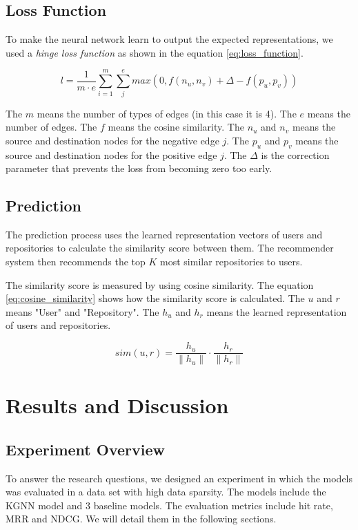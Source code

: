 \documentclass[11pt,twoside]{report}
\begin{document}
\section{Loss Function}
To make the neural network learn to output the expected representations, we used a \textit{hinge loss function} as shown in the equation \ref{eq:loss_function}.

\begin{equation}
    l=\frac{1}{m\cdot{e}}\sum_{i=1}^{m}\sum_{j}^{e} max(0, f(n_u, n_v)+\Delta-f(p_u, p_v))
    \label{eq:loss_function}
\end{equation}

The $m$ means the number of types of edges (in this case it is 4). The $e$ means the number of edges. The $f$ means the cosine similarity. The $n_u$ and $n_v$ means the source and destination nodes for the negative edge $j$. The $p_u$ and $p_v$ means the source and destination nodes for the positive edge $j$. The $\Delta$ is the correction parameter that prevents the loss from becoming zero too early.

\section{Prediction}
The prediction process uses the learned representation vectors of users and repositories to calculate the similarity score between them. The recommender system then recommends the top $K$ most similar repositories to users.

The similarity score is measured by using cosine similarity. The equation \ref{eq:cosine_similarity} shows how the similarity score is calculated. The $u$ and $r$ means "User" and "Repository". The $h_u$ and $h_r$ means the learned representation of users and repositories.

\begin{equation}
    sim(u, r) = \frac{h_u}{\|h_u\|}\cdot\frac{h_r}{\|h_r\|}
    \label{eq:cosine_similarity}
\end{equation}

\chapter{Results and Discussion}
\section{Experiment Overview}
To answer the research questions, we designed an experiment in which the models was evaluated in a data set with high data sparsity. The models include the KGNN model and 3 baseline models. The evaluation metrics include hit rate, MRR and NDCG. We will detail them in the following sections.
\end{document}
